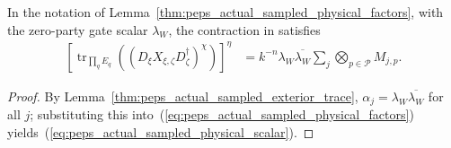 \begin{lemma}
    \label{thm:peps_actual_sampled_physical_scalar}
    \leanok
    In the notation of Lemma~\ref{thm:peps_actual_sampled_physical_factors},
    with the zero-party gate scalar $\lambda_W$, the contraction in
    \cite[proof of Theorem~5.2]{OpenAI2026PolynomialPEPS} satisfies
    \begin{align}
        \left[\operatorname{tr}_{\prod_qE_q}
            \left((D_\xi X_{\xi,\zeta}D_\zeta^\dagger)^\chi\right)\right]^\eta
         & =k^{-n}\lambda_W\overline{\lambda_W}
        \sum_j\bigotimes_{p\in\mathcal P}M_{j,p}.
        \label{eq:peps_actual_sampled_physical_scalar}
    \end{align}
\end{lemma}

\begin{proof}
    \leanok
    By Lemma~\ref{thm:peps_actual_sampled_exterior_trace},
    $\alpha_j=\lambda_W\overline{\lambda_W}$ for all $j$; substituting this
    into~(\ref{eq:peps_actual_sampled_physical_factors}) yields~(\ref{eq:peps_actual_sampled_physical_scalar}).
\end{proof}
